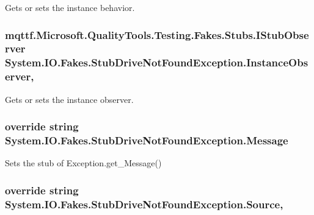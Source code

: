 Gets or sets the instance behavior.

\hypertarget{class_system_1_1_i_o_1_1_fakes_1_1_stub_drive_not_found_exception_aa6a44051e69038701315018622df2f2a}{
\subsubsection[{Instance\-Observer}]{\setlength{\rightskip}{0pt plus 5cm}mqttf.\-Microsoft.\-Quality\-Tools.\-Testing.\-Fakes.\-Stubs.\-I\-Stub\-Observer System.\-I\-O.\-Fakes.\-Stub\-Drive\-Not\-Found\-Exception.\-Instance\-Observer\hspace{0.3cm}{\ttfamily [get]}, {\ttfamily [set]}}}\label{class_system_1_1_i_o_1_1_fakes_1_1_stub_drive_not_found_exception_aa6a44051e69038701315018622df2f2a}


Gets or sets the instance observer.

\hypertarget{class_system_1_1_i_o_1_1_fakes_1_1_stub_drive_not_found_exception_aa840e1cddcd8e8a48b80eabb1cfc9afb}{
\subsubsection[{Message}]{\setlength{\rightskip}{0pt plus 5cm}override string System.\-I\-O.\-Fakes.\-Stub\-Drive\-Not\-Found\-Exception.\-Message\hspace{0.3cm}{\ttfamily [get]}}}\label{class_system_1_1_i_o_1_1_fakes_1_1_stub_drive_not_found_exception_aa840e1cddcd8e8a48b80eabb1cfc9afb}


Sets the stub of Exception.\-get\-\_\-\-Message()

\hypertarget{class_system_1_1_i_o_1_1_fakes_1_1_stub_drive_not_found_exception_a8d134df9ed9d8f6f4f2a532fd50ee953}{
\subsubsection[{Source}]{\setlength{\rightskip}{0pt plus 5cm}override string System.\-I\-O.\-Fakes.\-Stub\-Drive\-Not\-Found\-Exception.\-Source\hspace{0.3cm}{\ttfamily [get]}, {\ttfamily [set]}}}\label{class_system_1_1_i_o_1_1_fakes_1_1_stub_drive_not_found_exception_a8d134df9ed9d8f6f4f2a532fd50ee953}


